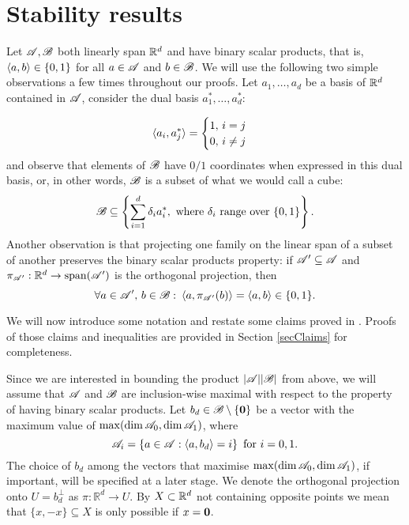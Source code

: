 \section{Stability results}\label{secStability}

Let ${\mathscr{A}}, {\mathscr{B}}$ both linearly span ${\mathbb{R}}^d$ and have binary scalar products, that is, $\langle a, b \rangle \in \{0,1\}$ for all $a \in {\mathscr{A}}$ and $b \in {\mathscr{B}}$. We will use the following two simple observations a few times throughout our proofs. Let $a_1, \ldots, a_d$ be a basis of ${\mathbb{R}}^d$ contained in ${\mathscr{A}}$, consider the dual basis $a_1^*, \ldots, a_d^*$:

\[
    \langle a_i, a_j^* \rangle = 
    \begin{cases}
        1,\, i = j \\
        0,\, i\neq j
    \end{cases}
\]
and observe that elements of ${\mathscr{B}}$ have $0/1$ coordinates when expressed in this dual basis, or, in other words, ${\mathscr{B}}$ is a subset of what we would call a cube: 
\[
    {\mathscr{B}} \subseteq \left\{\sum_{i=1}^d \delta_i a_i^*, \text{ where } \delta_i \text{ range over } \{0, 1\}\right\}.
\]
Another observation is that projecting one family on the linear span of a subset of another preserves the binary scalar products property: if ${\mathscr{A}}' \subseteq {\mathscr{A}}$ and $\pi_{{\mathscr{A}}'}: {\mathbb{R}}^d \rightarrow \operatorname{span}({\mathscr{A}}')$ is the orthogonal projection, then
\[
    \forall a \in {\mathscr{A}}',\, b \in {\mathscr{B}}:\: \langle a, \pi_{{\mathscr{A}}'}(b) \rangle = \langle a, b \rangle \in \{0,1\}. 
\]

\noindent We will now introduce some notation and restate some claims proved in \cite{kupavskii22}. Proofs of those claims and inequalities are provided in Section \ref{secClaims} for completeness.

\noindent Since we are interested in bounding the product $|{\mathscr{A}}||{\mathscr{B}}|$ from above, we will assume that ${\mathscr{A}}$ and ${\mathscr{B}}$ are inclusion-wise maximal with respect to the property of having binary scalar products. Let $b_d \in {\mathscr{B}} \setminus \{\mathbf{0}\}$ be a vector with the maximum value of $\operatorname{max}(\operatorname{dim}{\mathscr{A}}_0,\operatorname{dim}{\mathscr{A}}_1)$, where 
\[
    {\mathscr{A}}_i=\left\{a \in {\mathscr{A}}:\left\langle a, b_d\right\rangle=i\right\} \text{ for } i=0, 1.
\]
The choice of $b_d$ among the vectors that maximise $\operatorname{max}(\operatorname{dim}{\mathscr{A}}_0,\operatorname{dim}{\mathscr{A}}_1)$, if important, will be specified at a later stage. We denote the orthogonal projection onto $U=b_d^\bot$ as $\pi: \mathbb{R}^d \rightarrow U$. By $X\subset {\mathbb{R}}^d$ not containing opposite points we mean that $\{x,-x\}\subseteq X$ is only possible if $x=\mathbf{0}$. 


